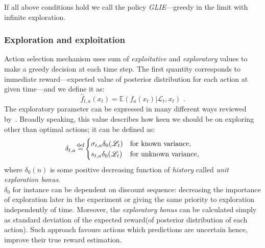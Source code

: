 \documentclass[12pt, a4paper, pdflatex, leqno]{report}
\newcommand{\myeq}{\stackrel{\mathclap{\normalfont\scriptsize\mbox{def}}}{=}}
\begin{document}
If all above conditions hold we call the policy \emph{GLIE}---greedy in the limit with infinite exploration.\\


\subsubsection{Exploration and exploitation}
Action selection mechanism uses sum of \emph{exploitative} and \emph{exploratory} values to make a greedy decision at each time step. The first quantity corresponds to immediate reward---expected value of posterior distribution for each action at given time---and we define it as:
\begin{equation}
  \label{eqn:exploitative} \hat{f}_{t,a} (x_t) = \mathbb{E} ( f_a(x_t) | \mathscr{L}_t, x_t ) \text{ .}
\end{equation}
The exploratory parameter can be expressed in many different ways reviewed by~\citep{meuleau:exploration}. Broadly speaking, this value describes how keen we should be on exploring other than optimal actions; it can be defined as:
$$
  \delta_{t,a} \myeq
    \begin{cases}
     \sigma_{t,a} \delta_0(\mathscr{L}_t) & \text{for known variance,}\\
     s_{t,a}      \delta_0(\mathscr{L}_t) & \text{for unknown variance,}
    \end{cases}
$$
where $\delta_0(n)$ is some positive decreasing function of \emph{history} called \emph{unit exploration bonus}.\\

$\delta_0$ for instance can be dependent on discount sequence: decreasing the importance of exploration later in the experiment or giving the same priority to exploration independently of time. Moreover, the \emph{exploratory bonus} can be calculated simply as standard deviation of the expected reward(of posterior distribution of each action). Such approach favours actions which predictions are uncertain hence, improve their true reward estimation.\\
\end{document}
